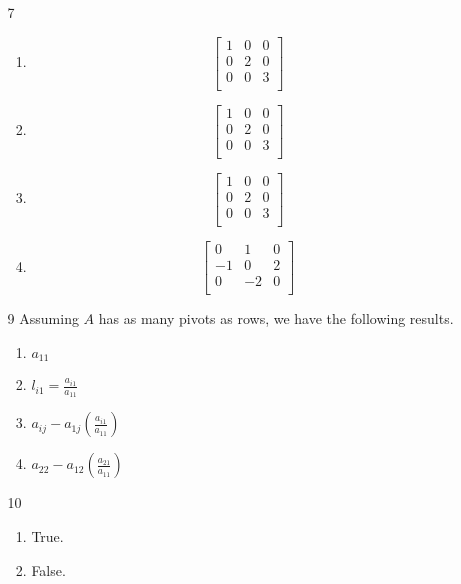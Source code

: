 \documentclass[12pt,letterpaper]{article}
\begin{document}
\begin{enumerate}
\begin{enumerate}
\[          \]
        \item [7]
          \begin{enumerate}[label=(\alph*)]
            \item
              \[
                \begin{bmatrix}
                  1 & 0 & 0 \\
                  0 & 2 & 0 \\
                  0 & 0 & 3 \\
                \end{bmatrix}
              \]
            \item
              \[
                \begin{bmatrix}
                  1 & 0 & 0 \\
                  0 & 2 & 0 \\
                  0 & 0 & 3 \\
                \end{bmatrix}
              \]
            \item
              \[
                \begin{bmatrix}
                  1 & 0 & 0 \\
                  0 & 2 & 0 \\
                  0 & 0 & 3 \\
                \end{bmatrix}
              \]
            \item
              \[
                \begin{bmatrix}
                  0  & 1  & 0 \\
                  -1 & 0  & 2 \\
                  0  & -2 & 0 \\
                \end{bmatrix}
              \]
          \end{enumerate}
        \item [9]
          Assuming $A$ has as many pivots as rows, we have the following results.
          \begin{enumerate}[label=(\alph*)]
            \item $a_{11}$
            \item $l_{i1} = \frac{a_{i1}}{a_{11}}$
            \item $a_{ij} - a_{1j}\left(\frac{a_{i1}}{a_{11}}\right)$
            \item $a_{22} - a_{12}\left(\frac{a_{21}}{a_{11}}\right)$
          \end{enumerate}
        \item [10]
          \begin{enumerate}[label=(\alph*)]
            \item True.
            \item
              False.


\end{enumerate}
\end{enumerate}
\end{enumerate}
\end{document}
